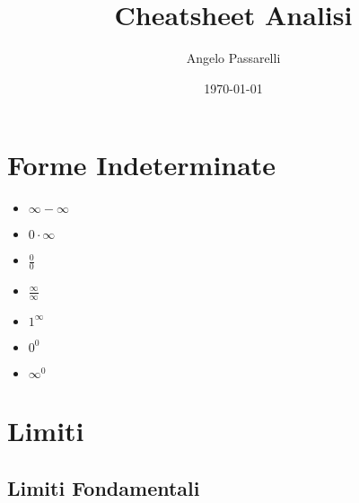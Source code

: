 \documentclass{article}
\title{Cheatsheet Analisi}
\author{Angelo Passarelli}
\date{\today}
\begin{document}
\maketitle

\section{Forme Indeterminate}

\begin{multicols}{2}
    \begin{itemize}
        \item $\infty - \infty$
        \item $0 \cdot \infty$
        \item $\frac{0}{0}$
        \item $\frac{\infty}{\infty}$
        \item $1^\infty$
        \item $0^0$
        \item $\infty^0$
    \end{itemize}
\end{multicols}

\section{Limiti}

\subsection{Limiti Fondamentali}
\end{document}
